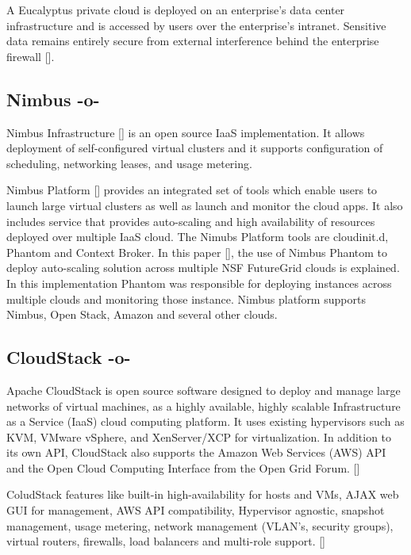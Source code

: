A Eucalyptus private cloud is deployed on an enterprise's data center
infrastructure and is accessed by users over the enterprise's
intranet. Sensitive data remains entirely secure from external
interference behind the enterprise firewall [\cite{www-eucalyptus}].

     
\subsection{Nimbus -o-}

Nimbus Infrastructure [\cite{www-nimbus-wiki}] is an open source IaaS
implementation. It allows deployment of self-configured virtual
clusters and it supports configuration of scheduling, networking
leases, and usage metering.

Nimbus Platform [\cite{www-nimbus}] provides an integrated set of tools
which enable users to launch large virtual clusters as well as launch
and monitor the cloud apps. It also includes service that provides
auto-scaling and high availability of resources deployed over multiple
IaaS cloud.  The Nimubs Platform tools are cloudinit.d, Phantom and
Context Broker.  In this paper [\cite{nimbus-paper}], the use of Nimbus
Phantom to deploy auto-scaling solution across multiple NSF FutureGrid
clouds is explained. In this implementation Phantom was responsible
for deploying instances across multiple clouds and monitoring those
instance.  Nimbus platform supports Nimbus, Open Stack, Amazon and
several other clouds.

\subsection{CloudStack -o-}

Apache CloudStack is open source software designed to deploy and
manage large networks of virtual machines, as a highly available,
highly scalable Infrastructure as a Service (IaaS) cloud computing
platform. It uses existing hypervisors such as KVM, VMware vSphere,
and XenServer/XCP for virtualization. In addition to its own API,
CloudStack also supports the Amazon Web Services (AWS) API and the
Open Cloud Computing Interface from the Open Grid
Forum. [\cite{www-cloudstack}]

ColudStack features like built-in high-availability for hosts and VMs,
AJAX web GUI for management, AWS API compatibility, Hypervisor
agnostic, snapshot management, usage metering, network management
(VLAN's, security groups), virtual routers, firewalls, load balancers
and multi-role support. [\cite{www-cloudstack-wikipedia}]
    
